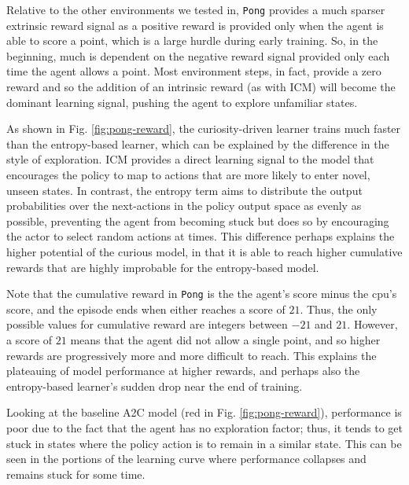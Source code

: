 \documentclass{article}
\begin{document}
Relative to the other environments we tested in, \texttt{Pong} provides a much sparser extrinsic reward signal as a positive reward is provided only when the agent is able to score a point, which is a large hurdle during early training. So, in the beginning, much is dependent on the negative reward signal provided only each time the agent allows a point. Most environment steps, in fact, provide a zero reward and so the addition of an intrinsic reward (as with ICM) will become the dominant learning signal, pushing the agent to explore unfamiliar states.

As shown in Fig. \ref{fig:pong-reward}, the curiosity-driven learner trains much faster than the entropy-based learner, which can be explained by the difference in the style of exploration. ICM provides a direct learning signal to the model that encourages the policy to map to actions that are more likely to enter novel, unseen states. In contrast, the entropy term aims to distribute the output probabilities over the next-actions in the policy output space as evenly as possible, preventing the agent from becoming stuck but does so by encouraging the actor to select random actions at times. This difference perhaps explains the higher potential of the curious model, in that it is able to reach higher cumulative rewards that are highly improbable for the entropy-based model.

Note that the cumulative reward in \texttt{Pong} is the the agent's score minus the cpu's score, and the episode ends when either reaches a score of $21$. Thus, the only possible values for cumulative reward are integers between $-21$ and $21$. However, a score of $21$ means that the agent did not allow a single point, and so higher rewards are progressively more and more difficult to reach. This explains the plateauing of model performance at higher rewards, and perhaps also the entropy-based learner's sudden drop near the end of training.

Looking at the baseline A2C model (red in Fig. \ref{fig:pong-reward}), performance is poor due to the fact that the agent has no exploration factor; thus, it tends to get stuck in states where the policy action is to remain in a similar state. This can be seen in the portions of the learning curve where performance collapses and remains stuck for some time.
\end{document}
